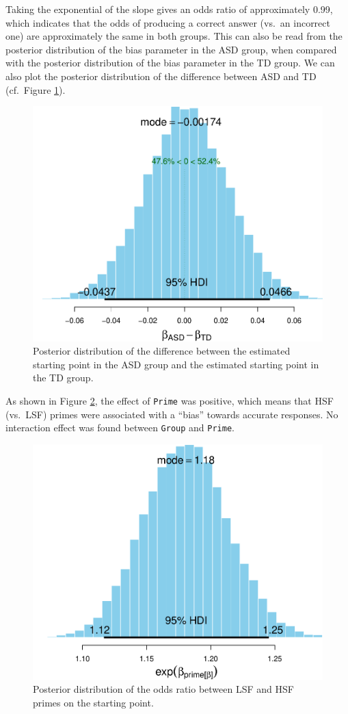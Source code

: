 \documentclass[
  11pt,
  english,
  ,doc,floatsintext]{apa6}
\begin{document}
Taking the exponential of the slope gives an odds ratio of approximately 0.99, which indicates that the odds of producing a correct answer (vs.~an incorrect one) are approximately the same in both groups. This can also be read from the posterior distribution of the bias parameter in the ASD group, when compared with the posterior distribution of the bias parameter in the TD group. We can also plot the posterior distribution of the difference between ASD and TD (cf.~Figure \ref{fig:posterior-bias-difference}).

\begin{figure}[!htb]

{\centering \includegraphics[width=0.5\linewidth]{supplementary_materials_files/figure-latex/posterior-bias-difference-1} 

}

\caption{Posterior distribution of the difference between the estimated starting point in the ASD group and the estimated starting point in the TD group.}\label{fig:posterior-bias-difference}
\end{figure}

As shown in Figure \ref{fig:posterior-bias-prime}, the effect of \texttt{Prime} was positive, which means that HSF (vs.~LSF) primes were associated with a ``bias'' towards accurate responses. No interaction effect was found between \texttt{Group} and \texttt{Prime}.

\begin{figure}[!htb]

{\centering \includegraphics[width=0.5\linewidth]{supplementary_materials_files/figure-latex/posterior-bias-prime-1} 

}

\caption{Posterior distribution of the odds ratio between LSF and HSF primes on the starting point.}\label{fig:posterior-bias-prime}
\end{figure}
\end{document}
